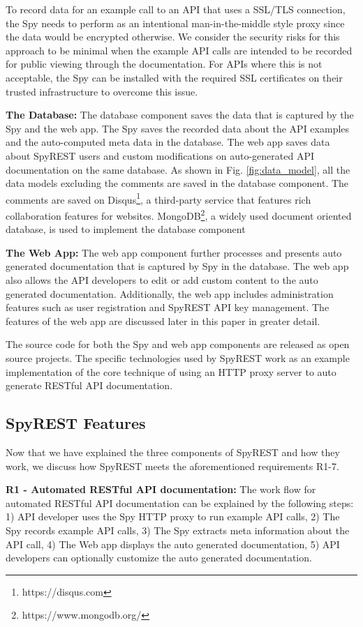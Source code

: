 \documentclass[conference]{IEEEtran}
\begin{document}
To record data for an example call to an API that uses a SSL/TLS connection, the Spy needs to perform as an intentional man-in-the-middle style proxy since the data would be encrypted otherwise. We consider the security risks for this approach to be minimal when the example API calls are intended to be recorded for public viewing through the documentation. For APIs where this is not acceptable, the Spy can be installed with the required SSL certificates on their trusted infrastructure to overcome this issue.

\textbf{The Database:} The database component saves the data that is captured by the Spy and the web app. The Spy saves the recorded data about the API examples and the auto-computed meta data in the database. The web app saves data about SpyREST users and custom modifications on auto-generated API documentation on the same database. As shown in Fig. \ref{fig:data_model}, all the data models excluding the comments are saved in the database component. The comments are saved on Disqus\footnote{https://disqus.com}, a third-party service that features rich collaboration features for websites. MongoDB\footnote{https://www.mongodb.org/}, a widely used document oriented database, is used to implement the database component

\textbf{The Web App:} The web app component further processes and presents auto generated documentation that is captured by Spy in the database. The web app also allows the API developers to edit or add custom content to the auto generated documentation. Additionally, the web app includes administration features such as user registration and SpyREST API key management. The features of the web app are discussed later in this paper in greater detail.

The source code for both the Spy and web app components are released as open source projects. The specific technologies used by SpyREST work as an example implementation of the core technique of using an HTTP proxy server to auto generate RESTful API documentation.

\subsection{SpyREST Features} %

Now that we have explained the three components of SpyREST and how they work, we discuss how SpyREST meets the aforementioned requirements R1-7.

\textbf{R1 - Automated RESTful API documentation:} The work flow for automated RESTful API documentation can be explained by the following steps: 1) API developer uses the Spy HTTP proxy to run example API calls, 2) The Spy records example API calls, 3) The Spy extracts meta information about the API call, 4) The Web app displays the auto generated documentation, 5) API developers can optionally customize the auto generated documentation.
\end{document}
